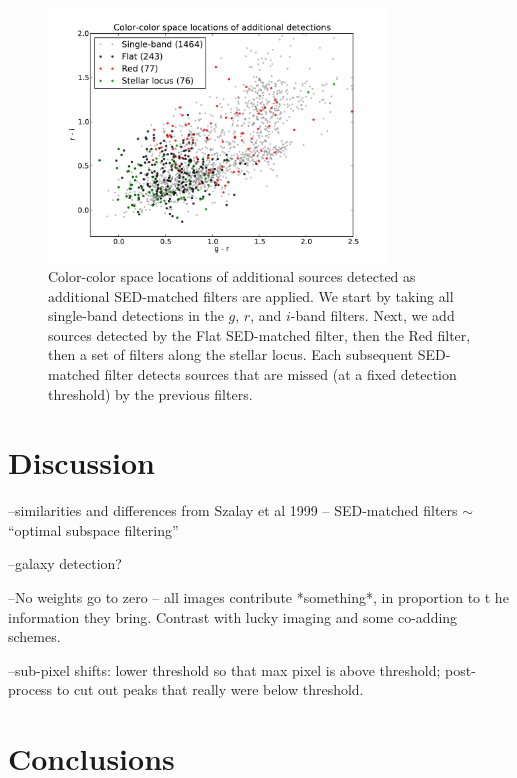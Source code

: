 \documentclass[letterpaper,preprint]{aastex62}
\begin{document}
\begin{figure}
\begin{center}
\includegraphics[width=0.8\textwidth]{mdetect-18}
\caption{Color-color space locations of additional sources detected as
  additional SED-matched filters are applied.  We start by taking all
  single-band detections in the $g$, $r$, and $i$-band filters.  Next,
  we add sources detected by the Flat SED-matched filter, then the Red
  filter, then a set of filters along the stellar locus.  Each
  subsequent SED-matched filter detects sources that are missed (at a
  fixed detection threshold) by the previous filters.
  \label{fig:added}}
\end{center}
\end{figure}


\section{Discussion}

--similarities and differences from Szalay et al 1999 -- SED-matched
filters $\sim$ ``optimal subspace filtering''

--galaxy detection?

--No weights go to zero -- all images contribute *something*, in
proportion to t he information they bring.  Contrast with lucky
imaging and some co-adding schemes.

--sub-pixel shifts: lower threshold so that max pixel is above
threshold; post-process to cut out peaks that really were below
threshold.


\section{Conclusions}
\end{document}

